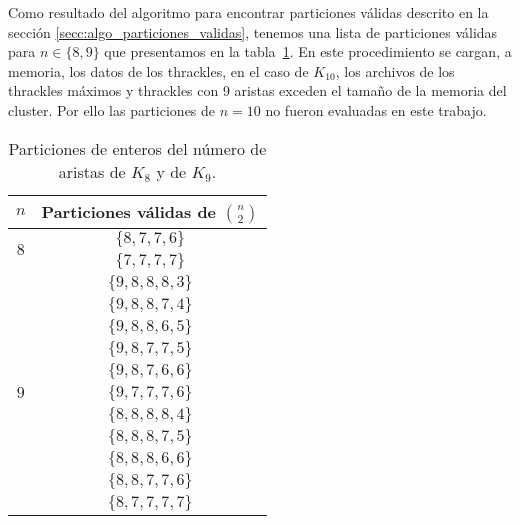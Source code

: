   Como resultado del algoritmo para encontrar particiones válidas descrito en la sección
  \ref{secc:algo_particiones_validas}, tenemos una lista de particiones válidas para
  $n\in\{8,9\}$ que presentamos en la tabla~\ref{tabla:particionesk8k9_2}. En este procedimiento se
  cargan, a memoria, los datos de los thrackles, en el caso de $K_{10}$, los archivos de los
  thrackles máximos y thrackles con 9 aristas exceden el tamaño de la memoria del cluster. Por ello
  las particiones de $n=10$ no fueron evaluadas en este trabajo.
  \begin{table}[t]
    \centering
    \begin{tabular}{|c|c|}
      \hline
      $n$                       & Particiones válidas de $\displaystyle\binom{n}{2}$ \\ \hline\hline
      \multirow{2}{*}{$ 8 $}    & $\{8,7,7,6\}$ \\ \cline{2-2}
                                & $\{7,7,7,7\}$ \\ \hline
      \multirow{11}{*}{$ 9 $}   &$\{9,8,8,8,3\}$ \\ \cline{2-2}
                                &$\{9,8,8,7,4\}$ \\ \cline{2-2}
                                &$\{9,8,8,6,5\}$ \\ \cline{2-2}
                                &$\{9,8,7,7,5\}$ \\ \cline{2-2}
                                &$\{9,8,7,6,6\}$ \\ \cline{2-2}
                                &$\{9,7,7,7,6\}$ \\ \cline{2-2}
                                &$\{8,8,8,8,4\}$ \\ \cline{2-2}
                                &$\{8,8,8,7,5\}$ \\ \cline{2-2}
                                &$\{8,8,8,6,6\}$ \\ \cline{2-2}
                                &$\{8,8,7,7,6\}$ \\ \cline{2-2}
                                &$\{8,7,7,7,7\}$ \\ \hline
    \end{tabular}
    \caption{Particiones de enteros del número de aristas de $K_8$ y de $K_9$. }
    \label{tabla:particionesk8k9_2}
  \end{table}

